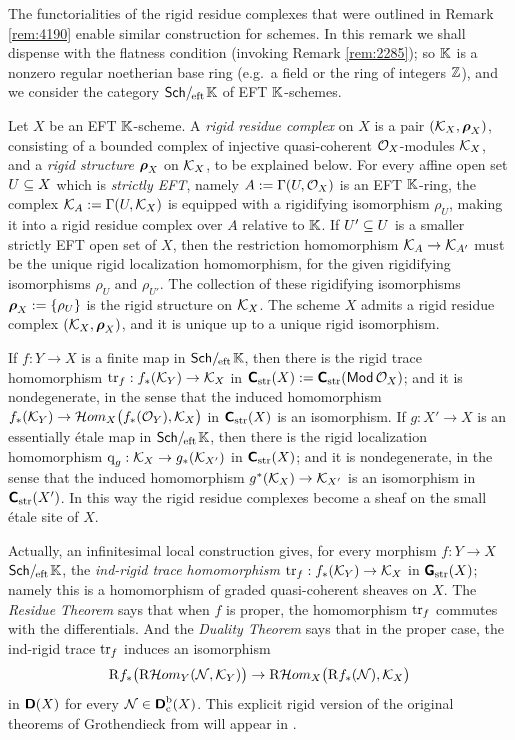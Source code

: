 \begin{rem} \label{rem:4192}  
The functorialities of the rigid residue complexes that were outlined in Remark 
\ref{rem:4190} enable similar construction for schemes. In this remark we shall 
dispense with the flatness condition (invoking Remark \ref{rem:2285}); so  
$\mathbb{K}$ is a nonzero regular noetherian base ring (e.g.\ a field or the ring of 
integers $\mathbb{Z}$), and we consider the category $\mathrm{\mathsf{Sch}} /_{\mspace{-2mu} \mathrm{eft}} \mspace{2mu} \mathbb{K}$
of EFT $\mathbb{K}$-schemes. 

Let $X$ be an EFT $\mathbb{K}$-scheme. A {\em rigid residue complex} on $X$ is a pair
$(\mathcal{K}_X, \boldsymbol{\rho}_X)$, consisting of a bounded complex of injective 
quasi-coherent $\mathcal{O}_X$-modules $\mathcal{K}_X$, and a {\em rigid structure} 
$\boldsymbol{\rho}_X$ on $\mathcal{K}_X$, to be explained below. 
For every affine open set $U \subseteq X$ which is 
{\em strictly EFT}, namely $A := \Gamma(U, \mathcal{O}_X)$ is an EFT $\mathbb{K}$-ring, the 
complex $\mathcal{K}_A := \Gamma(U, \mathcal{K}_X)$
is equipped with a rigidifying isomorphism $\rho_U$, making it into a 
rigid residue complex over $A$ relative to $\mathbb{K}$.
If $U' \subseteq U$ is a smaller strictly EFT open set of $X$, 
then the restriction homomorphism 
$\mathcal{K}_{A} \to \mathcal{K}_{A'}$
must be the unique rigid localization homomorphism, for the given 
rigidifying isomorphisms $\rho_{U}$ and $\rho_{U'}$.
The collection of these rigidifying isomorphisms 
$\boldsymbol{\rho}_X := \{ \rho_U \}$
is the rigid structure on $\mathcal{K}_X$. 
The scheme $X$ admits a rigid residue complex $(\mathcal{K}_X, \boldsymbol{\rho}_X)$, and it 
is unique up to a unique rigid isomorphism. 

If $f : Y \to X$ is a finite map in $\mathrm{\mathsf{Sch}} /_{\mspace{-2mu} \mathrm{eft}} \mspace{2mu} \mathbb{K}$, then 
there is the rigid trace homomorphism 
$\operatorname{tr}_f : f_{*}(\mathcal{K}_Y) \to \mathcal{K}_X$
in $\boldsymbol{\mathsf{C}}_{\mathrm{str}}(X) := \boldsymbol{\mathsf{C}}_{\mathrm{str}}(\operatorname{\mathsf{Mod}} \mathcal{O}_X)$; 
and it is nondegenerate, in the sense that the 
induced homomorphism 
$f_{*}(\mathcal{K}_Y) \to \mathcal{H}om_{X} \bigl( f_*(\mathcal{O}_Y), \mathcal{K}_X \bigr)$
in $\boldsymbol{\mathsf{C}}_{\mathrm{str}}(X)$ is an isomorphism. 
If $g : X' \to X$ is an essentially \'etale map in 
$\mathrm{\mathsf{Sch}} /_{\mspace{-2mu} \mathrm{eft}} \mspace{2mu} \mathbb{K}$, then 
there is the rigid localization homomorphism 
$\operatorname{q}_g : \mathcal{K}_X \to g_{*}(\mathcal{K}_{X'})$
in $\boldsymbol{\mathsf{C}}_{\mathrm{str}}(X)$; and it is nondegenerate, in the sense that the 
induced homomorphism 
$g^*(\mathcal{K}_X) \to \mathcal{K}_{X'}$
is an isomorphism in $\boldsymbol{\mathsf{C}}_{\mathrm{str}}(X')$. In this way the rigid residue 
complexes become a sheaf on the small \'etale site of $X$. 

Actually, an infinitesimal local construction gives, for every morphism 
$f : Y \to X$ $\mathrm{\mathsf{Sch}} /_{\mspace{-2mu} \mathrm{eft}} \mspace{2mu} \mathbb{K}$, 
the {\em ind-rigid trace homomorphism}
$\operatorname{tr}_f : f_{*}(\mathcal{K}_Y) \to \mathcal{K}_X$
in $\boldsymbol{\mathsf{G}}_{\mathrm{str}}(X)$; namely this is a homomorphism of graded 
quasi-coherent sheaves on $X$. The {\em Residue Theorem} says that when $f$ is 
proper, the homomorphism $\operatorname{tr}_f$ commutes with the differentials. 
And the {\em Duality Theorem} says that in the proper case, the ind-rigid trace 
$\operatorname{tr}_f$ induces an isomorphism 
\[ \mathrm{R} f_{*} \bigl( \mathrm{R} \mathcal{H}om_{Y}(\mathcal{N}, \mathcal{K}_Y) \bigr) \to  
\mathrm{R} \mathcal{H}om_{X} \bigr( \mathrm{R} f_{*}(\mathcal{N}), \mathcal{K}_X \bigr) \]
in $\boldsymbol{\mathsf{D}}(X)$ for every 
$\mathcal{N} \in \boldsymbol{\mathsf{D}}_{\mathrm{c}}^{\mathrm{b}}(X)$.
This explicit rigid version of the original theorems of Grothendieck from 
\cite{RD} will appear in \cite{Ye12}. 
\end{rem}


